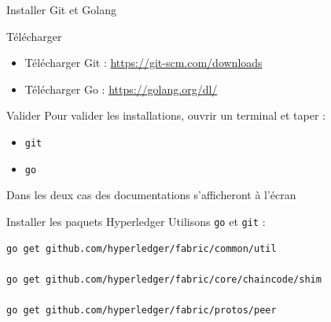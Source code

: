 \documentclass[presentation]{beamer}
\begin{document}
\begin{frame}[fragile,label={sec:org1ad94dd}]{Installer Git et Golang}
 \begin{block}{Télécharger}
\begin{itemize}
\item Télécharger Git : \url{https://git-scm.com/downloads}
\item Télécharger Go : \url{https://golang.org/dl/}
\end{itemize}
\end{block}
\begin{block}{Valider}
Pour valider les installations, ouvrir un terminal et taper :
\begin{itemize}
\item \texttt{git}
\item \texttt{go}
\end{itemize}

Dans les deux cas des documentations s'afficheront à l'écran
\end{block}
\end{frame}
\begin{frame}[fragile,label={sec:org89b0332}]{Installer les paquets Hyperledger}
 Utilisons \texttt{go} et \texttt{git} :

\begin{verbatim}
go get github.com/hyperledger/fabric/common/util

go get github.com/hyperledger/fabric/core/chaincode/shim

go get github.com/hyperledger/fabric/protos/peer
\end{verbatim}
\end{frame}
\end{document}
